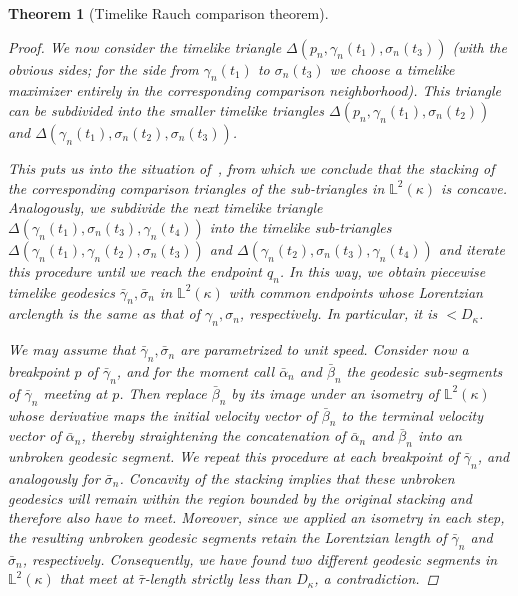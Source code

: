 \documentclass[a4paper,11pt]{article}
\numberwithin{equation}{section}
\theoremstyle{plain}
\newtheorem{Theorem}[Definition]{Theorem}
\theoremstyle{definition}
\newcommand{\lm}[1]{\mathbb{L}^2(#1)}
\begin{document}
\begin{Theorem}[Timelike Rauch comparison theorem]
\begin{proof}
    We now consider the timelike triangle $\Delta(p_n,\gamma_n(t_1),\sigma_n(t_3))$ (with the obvious sides; for the side from $\gamma_n(t_1)$ to $\sigma_n(t_3)$ we choose a timelike maximizer entirely in the corresponding comparison neighborhood). This triangle can be subdivided into the smaller timelike triangles $\Delta(p_n,\gamma_n(t_1),\sigma_n(t_2))$ and $\Delta(\gamma_n(t_1),\sigma_n(t_2),\sigma_n(t_3))$. 
    
    
    This puts us into the situation of~\cite[Prop.\ 2.42]{beran2023splitting}, from which we conclude that the stacking of the corresponding comparison triangles of the sub-triangles in $\lm{\kappa}$ is concave. Analogously, we subdivide the next timelike triangle 
    $\Delta(\gamma_n(t_1),\sigma_n(t_3),\gamma_n(t_4))$ into the timelike sub-triangles $\Delta(\gamma_n(t_1),\gamma_n(t_2),\sigma_n(t_3))$ and $\Delta(\gamma_n(t_2),\sigma_n(t_3),\gamma_n(t_4))$ and iterate this procedure until we reach the endpoint $q_n$.
    In this way, we obtain piecewise timelike geodesics $\bar{\gamma}_n,\bar{\sigma}_n$ in $\lm{\kappa}$ with common endpoints whose Lorentzian arclength is the same as that of $\gamma_n,\sigma_n$, respectively. In particular, it is $< D_{\kappa}$. 

    We may assume that $\bar{\gamma}_n,\bar{\sigma}_n$ are parametrized to unit speed.
    Consider now a breakpoint $p$ of $\bar{\gamma}_n$, and for the moment call $\bar{\alpha}_n$ and $\bar{\beta}_n$ the geodesic sub-segments of $\bar{\gamma}_n$ meeting at $p$. Then replace $\bar{\beta}_n$ by its image under an isometry of 
    $\lm{\kappa}$ whose derivative maps the initial velocity vector of $\bar{\beta}_n$ to the terminal velocity vector of 
    $\bar{\alpha}_n$, thereby straightening the concatenation of $\bar{\alpha}_n$ and $\bar{\beta}_n$ into an unbroken geodesic
    segment. We repeat this procedure at each breakpoint of $\bar{\gamma}_n$, and analogously for $\bar{\sigma}_n$.
    Concavity of the stacking implies that these unbroken geodesics will remain within the region bounded by the original stacking and therefore also have to meet. Moreover, since we applied an isometry in each step, the resulting unbroken geodesic segments retain the Lorentzian length of $\bar{\gamma}_n$ and $\bar{\sigma}_n$, respectively. Consequently, we have found two different geodesic segments in $\lm{\kappa}$ that meet at $\bar{\tau}$-length strictly less than $D_{\kappa}$, a contradiction.
\end{proof}
\end{Theorem}
\end{document}
